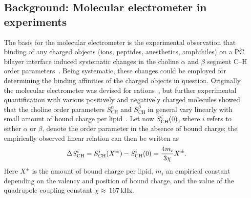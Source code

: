 \documentclass[twoside,twocolumn,9pt]{article}
\begin{document}
\subsection{Background: Molecular electrometer in experiments}\label{conceptinexperiments}
The basis for the molecular electrometer is the experimental observation that
binding of any charged objects (ions, peptides, anesthetics, amphihiles) on a PC bilayer interface induced
systematic changes in the choline $\alpha$ and $\beta$
segment C--H order parameters~\cite{brown77,akutsu81,altenbach84,altenbach85,seelig87,macdonald87,scherer89,roux90,beschiasvili91,marassi92,rydall92}.
Being systematic, these changes could be employed for determining the binding affinities of the charged objects in question.
Originally the molecular electrometer was devised for cations~\cite{brown77,akutsu81,altenbach84}, but
further experimental quantification with various positively and negatively charged 
molecules showed that the choline order parameters $S_\mathrm{CH}^\alpha$ and $S_\mathrm{CH}^\beta$ 
in general vary linearly with small amount of bound charge per 
lipid~\cite{altenbach84,altenbach85,seelig87,macdonald87,scherer89,roux90,beschiasvili91,marassi92,rydall92}. 
Let now $S_{\rm{CH}}^{i}(0)$, where $i$ refers to either $\alpha$ or $\beta$, denote the order parameter in the absence of bound charge;
the empirically observed linear relation %
can then be written as~\cite{ferreira16}
\begin{equation}\label{OPchangeEQ}
\Delta S_{\rm{CH}}^{i}= S_{\rm{CH}}^{i}(X^\pm)-S_{\rm{CH}}^{i}(0) =\frac{4m_i }{3\chi}X^\pm.
\end{equation}
Here $X^\pm$ is the amount of bound charge per lipid, 
$m_i$ an empirical constant depending on the valency and position of bound charge,
and the value of the quadrupole coupling constant $\chi \approx$\,167\,kHz. 
\end{document}
